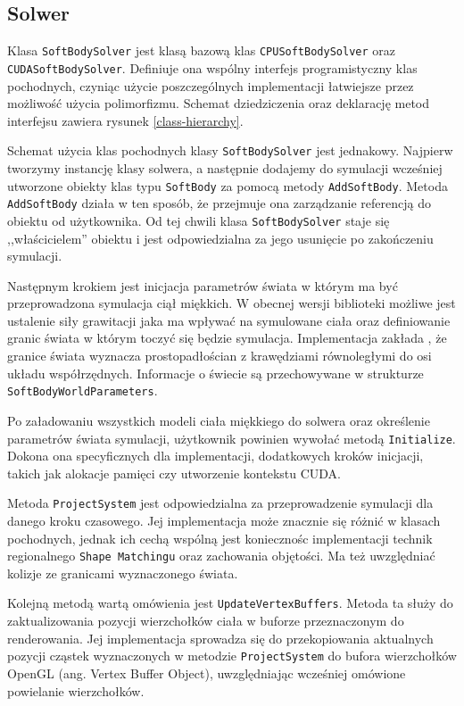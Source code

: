 {\subsection{Solwer}
Klasa \texttt{SoftBodySolver} jest klasą bazową klas \texttt{CPUSoftBodySolver}
oraz \texttt{CUDASoftBodySolver}. Definiuje ona wspólny interfejs
programistyczny klas pochodnych, czyniąc użycie poszczególnych
implementacji łatwiejsze przez możliwość użycia polimorfizmu. Schemat dziedziczenia
oraz deklarację metod interfejsu zawiera rysunek \ref{class-hierarchy}.

Schemat użycia klas pochodnych klasy \texttt{SoftBodySolver} jest jednakowy.
Najpierw tworzymy instancję klasy solwera, a następnie dodajemy do symulacji 
wcześniej utworzone obiekty klas typu \texttt{SoftBody} za pomocą metody
\texttt{AddSoftBody}. Metoda \texttt{AddSoftBody} działa w ten sposób, że
przejmuje ona zarządzanie referencją do obiektu od użytkownika. Od tej chwili
klasa \texttt{SoftBodySolver} staje się ,,właścicielem'' obiektu i jest
odpowiedzialna za jego usunięcie po zakończeniu symulacji.

Następnym krokiem jest inicjacja parametrów świata w którym ma być
przeprowadzona symulacja ciął miękkich. W obecnej wersji biblioteki możliwe jest
ustalenie siły grawitacji jaka ma wpływać na symulowane ciała oraz definiowanie
granic świata w którym toczyć się będzie symulacja. Implementacja zakłada
, że granice świata wyznacza prostopadłościan z krawędziami równoległymi
do osi układu współrzędnych. Informacje o świecie są przechowywane w strukturze
\texttt{SoftBodyWorldParameters}.

Po załadowaniu wszystkich modeli ciała miękkiego do solwera oraz określenie
parametrów świata symulacji, użytkownik powinien
wywołać metodą \texttt{Initialize}. Dokona ona specyficznych dla implementacji,
	dodatkowych kroków inicjacji, takich jak alokacje pamięci czy
	utworzenie kontekstu CUDA.

Metoda \texttt{ProjectSystem} jest odpowiedzialna za przeprowadzenie
symulacji dla danego kroku czasowego. Jej implementacja może znacznie się różnić
w klasach pochodnych, jednak ich cechą wspólną jest koniecznośc implementacji
technik regionalnego \texttt{Shape Matchingu} oraz zachowania objętości. Ma też
uwzględniać kolizje ze granicami wyznaczonego świata.

Kolejną metodą wartą omówienia jest \texttt{UpdateVertexBuffers}. Metoda ta
służy do zaktualizowania pozycji wierzchołków ciała w buforze przeznaczonym do
renderowania. Jej implementacja sprowadza się do przekopiowania aktualnych
pozycji cząstek wyznaczonych w metodzie \texttt{ProjectSystem} do bufora wierzchołków
OpenGL (ang. Vertex Buffer Object), uwzględniając wcześniej omówione powielanie wierzchołków.

}
